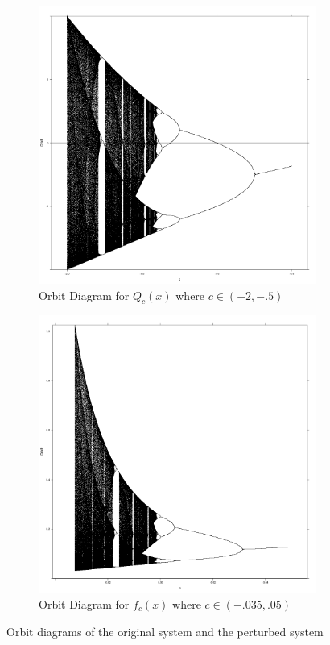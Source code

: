 	\begin{figure}[h]
		\centering
		\begin{subfigure}[b]{0.48\textwidth}
				\includegraphics[width=\textwidth]{./img/stdperdub}
				\caption{Orbit Diagram for $Q_c (x)$ where $c\in (-2, -.5)$}
		\end{subfigure}
		\begin{subfigure}[b]{0.48\textwidth}
				\includegraphics[width=\textwidth]{./img/pertperdub}
				\caption{Orbit Diagram for $f_c (x)$ where $c\in (-.035, .05)$}
		\end{subfigure}%
		\caption{Orbit diagrams of the original system and the perturbed system}\label{fig:perdub}
	\end{figure}


